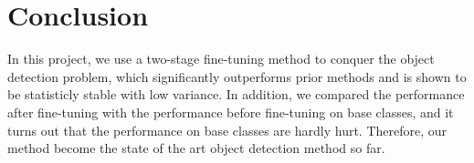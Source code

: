 \section{Conclusion}
In this project, we use a two-stage fine-tuning method to conquer the object detection problem, which significantly outperforms prior methods and is shown to be statisticly stable with low variance. In addition, we compared the performance after fine-tuning with the performance before fine-tuning on base classes, and it turns out that the performance on base classes are hardly hurt. Therefore, our method become the state of the art object detection method so far.
